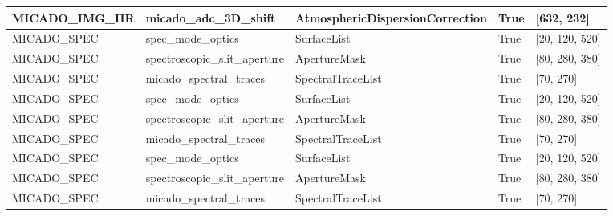 \begin{longtable*}[c]{|p{0.181\DUtablewidth}|p{0.270\DUtablewidth}|p{0.262\DUtablewidth}|p{0.077\DUtablewidth}|p{0.165\DUtablewidth}|}
MICADO\_IMG\_HR
 & 
micado\_adc\_3D\_shift
 & 
AtmosphericDispersionCorrection
 & 
True
 & 
{[}632, 232{]}
 \\
\hline

MICADO\_SPEC
 & 
spec\_mode\_optics
 & 
SurfaceList
 & 
True
 & 
{[}20, 120, 520{]}
 \\
\hline

MICADO\_SPEC
 & 
spectroscopic\_slit\_aperture
 & 
ApertureMask
 & 
True
 & 
{[}80, 280, 380{]}
 \\
\hline

MICADO\_SPEC
 & 
micado\_spectral\_traces
 & 
SpectralTraceList
 & 
True
 & 
{[}70, 270{]}
 \\
\hline

MICADO\_SPEC
 & 
spec\_mode\_optics
 & 
SurfaceList
 & 
True
 & 
{[}20, 120, 520{]}
 \\
\hline

MICADO\_SPEC
 & 
spectroscopic\_slit\_aperture
 & 
ApertureMask
 & 
True
 & 
{[}80, 280, 380{]}
 \\
\hline

MICADO\_SPEC
 & 
micado\_spectral\_traces
 & 
SpectralTraceList
 & 
True
 & 
{[}70, 270{]}
 \\
\hline

MICADO\_SPEC
 & 
spec\_mode\_optics
 & 
SurfaceList
 & 
True
 & 
{[}20, 120, 520{]}
 \\
\hline

MICADO\_SPEC
 & 
spectroscopic\_slit\_aperture
 & 
ApertureMask
 & 
True
 & 
{[}80, 280, 380{]}
 \\
\hline

MICADO\_SPEC
 & 
micado\_spectral\_traces
 & 
SpectralTraceList
 & 
True
 & 
{[}70, 270{]}
 \\
\hline
\end{longtable*}
\label{tbl-effects-summary}
